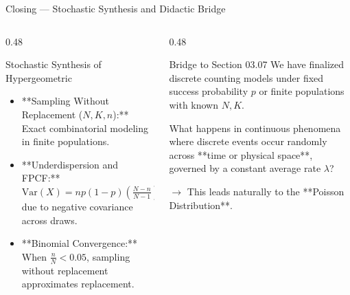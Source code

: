 \documentclass[aspectratio=169,xcolor={dvipsnames,table}]{beamer}
\begin{document}
\begin{frame}{Closing --- Stochastic Synthesis and Didactic Bridge}
	\vspace{-0.15cm}
	\begin{columns}[T]
		\begin{column}{0.48\textwidth}
			\begin{block}{Stochastic Synthesis of Hypergeometric}
				\footnotesize
				\begin{itemize}
					\itemsep=0.08cm
					\item **Sampling Without Replacement ($N, K, n$):** Exact combinatorial modeling in finite populations.
					\item **Underdispersion and FPCF:** $\text{Var}(X) = np(1-p)\left(\frac{N-n}{N-1}\right) < np(1-p)$ due to negative covariance across draws.
					\item **Binomial Convergence:** When $\frac{n}{N} < 0.05$, sampling without replacement approximates replacement.
				\end{itemize}
			\end{block}
		\end{column}
		\begin{column}{0.48\textwidth}
			\begin{alertblock}{Bridge to Section 03.07}
				\footnotesize
				We have finalized discrete counting models under fixed success probability $p$ or finite populations with known $N, K$.
				
				What happens in continuous phenomena where discrete events occur randomly across **time or physical space**, governed by a constant average rate $\lambda$?
				
				$\to$ This leads naturally to the **Poisson Distribution**.
			\end{alertblock}
		\end{column}
	\end{columns}
\end{frame}
\end{document}
